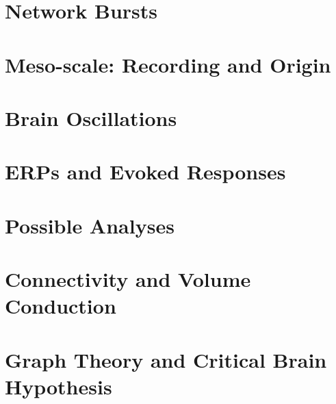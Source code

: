 \documentclass[12pt]{article}
\begin{document}
\section{Network Bursts}
\graphicspath{ {./images/7/} }

\newpage

\section{Meso-scale: Recording and Origin}
\graphicspath{ {./images/9/} }

\newpage

\section{Brain Oscillations}
\graphicspath{ {./images/10/} }

\newpage

% 

\section{ERPs and Evoked Responses}
\graphicspath{ {./images/12/} }

\newpage

\section{Possible Analyses}
\graphicspath{ {./images/13/} }

\newpage

\section{Connectivity and Volume Conduction}
\graphicspath{ {./images/14/} }

\newpage

\section{Graph Theory and Critical Brain Hypothesis}
\graphicspath{ {./images/15/} }

\newpage
\end{document}
